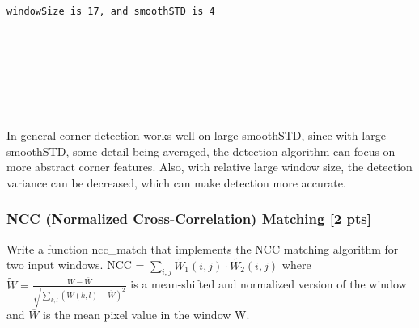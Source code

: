 \documentclass[11pt]{article}
\begin{document}
    \begin{Verbatim}[commandchars=\\\{\}]


windowSize is 17, and smoothSTD is 4

    \end{Verbatim}

    \begin{center}
    \end{center}
    { \hspace*{\fill} \\}
    
    \begin{center}
    \end{center}
    { \hspace*{\fill} \\}
    
    \begin{Verbatim}[commandchars=\\\{\}]



    \end{Verbatim}

    In general corner detection works well on large smoothSTD, since with
large smoothSTD, some detail being averaged, the detection algorithm can
focus on more abstract corner features. Also, with relative large window
size, the detection variance can be decreased, which can make detection
more accurate.

    \hypertarget{ncc-normalized-cross-correlation-matching-2-pts}{%
\subsubsection{NCC (Normalized Cross-Correlation) Matching {[}2
pts{]}}\label{ncc-normalized-cross-correlation-matching-2-pts}}

Write a function ncc\_match that implements the NCC matching algorithm
for two input windows. NCC =
\(\sum_{i,j}\tilde{W_1} (i,j)\cdot \tilde{W_2} (i,j)\) where
\(\tilde{W} = \frac{W - \overline{W}}{\sqrt{\sum_{k,l}(W(k,l) - \overline{W})^2}}\)
is a mean-shifted and normalized version of the window and
\(\overline{W}\) is the mean pixel value in the window W.
\end{document}
